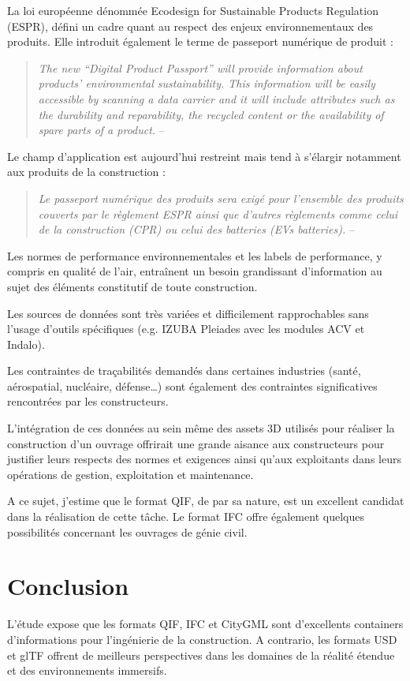 \documentclass[a4paper,12pt]{article}
\begin{document}
La loi européenne dénommée Ecodesign for Sustainable Products Regulation (ESPR), défini un cadre quant au respect des enjeux environnementaux des produits. 
Elle introduit également le terme de passeport numérique de produit :

\begin{quote}
\emph{The new “Digital Product Passport” will provide information about products’ environmental sustainability. This information will be easily accessible by scanning a data carrier and it will include attributes such as the durability and reparability, the recycled content or the availability of spare parts of a product.} -- \cite{europaEcodesignSustainable}
\end{quote}

Le champ d'application est aujourd'hui restreint mais tend à s'élargir notamment aux produits de la construction :

\begin{quote}
\emph{Le passeport numérique des produits sera exigé pour l’ensemble des produits couverts par le règlement ESPR ainsi que d’autres règlements comme celui de la construction (CPR) ou celui des batteries (EVs batteries).} -- \cite{PasseportNumeriqueProduits}
\end{quote}

Les normes de performance environnementales et les labels de performance, y compris en qualité de l'air, entraînent un besoin grandissant d'information au sujet des éléments constitutif de toute construction.

Les sources de données sont très variées et difficilement rapprochables sans l'usage d'outils spécifiques (e.g. IZUBA Pleiades avec les modules ACV et Indalo). 

Les contraintes de traçabilités demandés dans certaines industries (santé, aérospatial, nucléaire, défense\ldots{}) sont également des contraintes significatives rencontrées par les constructeurs.

L'intégration de ces données au sein même des assets 3D utilisés pour réaliser la construction d'un ouvrage offrirait une grande aisance aux constructeurs pour justifier leurs respects des normes et exigences ainsi qu'aux exploitants dans leurs opérations de gestion, exploitation et maintenance. 

A ce sujet, j'estime que le format QIF, de par sa nature, est un excellent candidat dans la réalisation de cette tâche. Le format IFC offre également quelques possibilités concernant les ouvrages de génie civil.
\section*{Conclusion}
\label{sec:org15bad7b}
L'étude expose que les formats QIF, IFC et CityGML sont d'excellents containers d'informations pour l'ingénierie de la construction. A contrario, les formats USD et glTF offrent de meilleurs perspectives dans les domaines de la réalité étendue et des environnements immersifs. 
\end{document}

